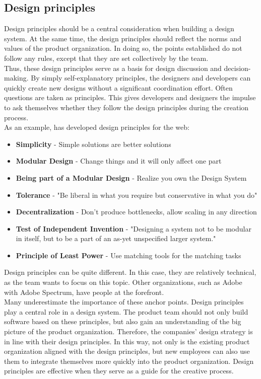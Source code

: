 \subsection{Design principles}\label{design_principles}
Design principles should be a central consideration when building a design system. At the same time, the design principles should reflect the norms and values of the product organization. In doing so, the points established do not follow any rules, except that they are set collectively by the team. \\
Thus, these design principles serve as a basis for design discussion and decision-making. By simply self-explanatory principles, the designers and developers can quickly create new designs without a significant coordination effort. Often questions are taken as principles. This gives developers and designers the impulse to ask themselves whether they follow the design principles during the creation process. \cite{brignell_design_2022} \\
As an example, \citet{berners-lee_principles_2013} has developed design principles for the web: 
\begin{itemize}
\item \textbf{Simplicity} - Simple solutions are better solutions
\item \textbf{Modular Design} - Change things and it will only affect one part
\item \textbf{Being part of a Modular Design} - Realize you own the Design System
\item \textbf{Tolerance} - "Be liberal in what you require but conservative in what you do"
\item \textbf{Decentralization} - Don't produce bottlenecks, allow scaling in any direction
\item \textbf{Test of Independent Invention} - "Designing a system not to be modular in itself, but to be a part of an as-yet unspecified larger system."
\item \textbf{Principle of Least Power} - Use matching tools for the matching tasks
\end{itemize}
Design principles can be quite different. In this case, they are relatively technical, as the team wants to focus on this topic. Other organizations, such as Adobe with Adobe Spectrum, have people at the forefront. \cite{spectrum_adobe_spectrum_nodate} \\
Many underestimate the importance of these anchor points. Design principles play a central role in a design system.  The product team should not only build software based on these principles, but also gain an understanding of the big picture of the product organization. Therefore, the companies' design strategy is in line with their design principles. In this way, not only is the existing product organization aligned with the design principles, but new employees can also use them to integrate themselves more quickly into the product organization. Design principles are effective when they serve as a guide for the creative process.\cite{vesselov_building_2019} \\
